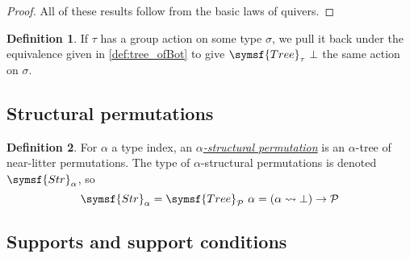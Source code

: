\documentclass{article}
\newcommand{\cdef}[3]{\href{https://leanprover-community.github.io/con-nf/doc/ConNF/#1.html\#ConNF.#2}{\emph{#3}}}
\theoremstyle{definition}
\newtheorem{definition}{Definition}[section]
\theoremstyle{remark}
\begin{document}
\begin{proof}
    All of these results follow from the basic laws of quivers.
\end{proof}
\begin{definition}
    If \( \tau \) has a group action on some type \( \sigma \), we pull it back under the equivalence given in \cref{def:tree_ofBot} to give \( \symsf{Tree}_\tau\ \bot \) the same action on \( \sigma \).
\end{definition}

\subsection{Structural permutations}

\begin{definition}
    For \( \alpha \) a type index, an \cdef{Structural/StructPerm}{StructPerm}{\( \alpha \)-structural permutation} is an \( \alpha \)-tree of near-litter permutations.
    The type of \( \alpha \)-structural permutations is denoted \( \symsf{Str}_\alpha \), so
    \[ \symsf{Str}_\alpha = \symsf{Tree}_{\mathcal P}\ \alpha = (\alpha \rightsquigarrow \bot) \to \mathcal P \]
\end{definition}

\subsection{Supports and support conditions}
\end{document}
